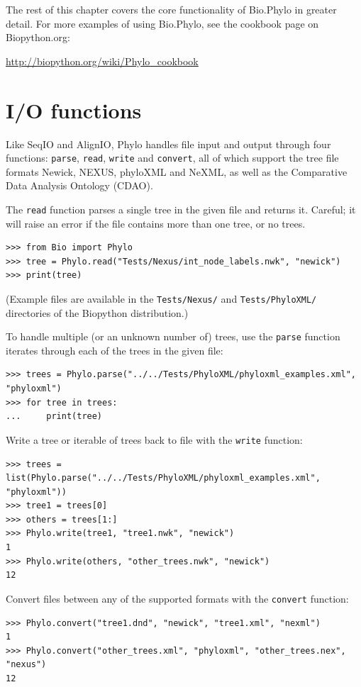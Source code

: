 \documentclass{report}
\begin{document}
The rest of this chapter covers the core functionality of Bio.Phylo in greater detail. For more
examples of using Bio.Phylo, see the cookbook page on Biopython.org:

\url{http://biopython.org/wiki/Phylo_cookbook}

\section{I/O functions}

Like SeqIO and AlignIO, Phylo handles file input and output through four functions:
\verb|parse|, \verb|read|, \verb|write| and \verb|convert|,
all of which support the tree file formats Newick, NEXUS, phyloXML and NeXML, as
well as the Comparative Data Analysis Ontology (CDAO).

The \verb|read| function parses a single tree in the given file and returns it. Careful; it
will raise an error if the file contains more than one tree, or no trees.

\begin{verbatim}
>>> from Bio import Phylo
>>> tree = Phylo.read("Tests/Nexus/int_node_labels.nwk", "newick")
>>> print(tree)
\end{verbatim}

(Example files are available in the \texttt{Tests/Nexus/} and \texttt{Tests/PhyloXML/}
directories of the Biopython distribution.)

To handle multiple (or an unknown number of) trees, use the \verb|parse| function iterates
through each of the trees in the given file: 

\begin{verbatim}
>>> trees = Phylo.parse("../../Tests/PhyloXML/phyloxml_examples.xml", "phyloxml")
>>> for tree in trees:
...     print(tree)
\end{verbatim}

Write a tree or iterable of trees back to file with the \verb|write| function:

\begin{verbatim}
>>> trees = list(Phylo.parse("../../Tests/PhyloXML/phyloxml_examples.xml", "phyloxml"))
>>> tree1 = trees[0]
>>> others = trees[1:]
>>> Phylo.write(tree1, "tree1.nwk", "newick")
1
>>> Phylo.write(others, "other_trees.nwk", "newick")
12
\end{verbatim}

Convert files between any of the supported formats with the \verb|convert| function:

\begin{verbatim}
>>> Phylo.convert("tree1.dnd", "newick", "tree1.xml", "nexml")
1
>>> Phylo.convert("other_trees.xml", "phyloxml", "other_trees.nex", "nexus")
12
\end{verbatim}
\end{document}
